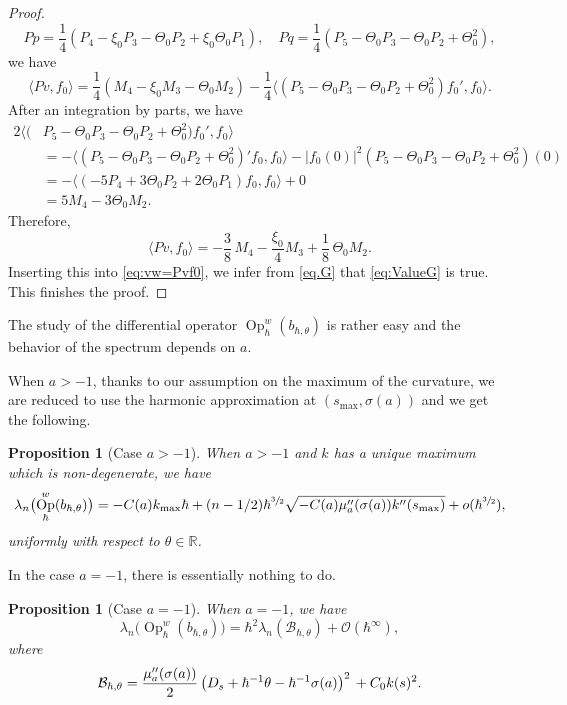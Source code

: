 \documentclass[10pt]{amsart}
\DeclareMathOperator{\Op}{Op}
\theoremstyle{plain}
\newtheorem{proposition}[theorem]{Proposition}
\theoremstyle{definition}
\begin{document}
\begin{proof}
\[
Pp=\frac14(P_4-\xi_0P_3-\Theta_0P_2+\xi_0\Theta_0P_1), \quad Pq=\frac14(P_5-\Theta_0P_3-\Theta_0P_2+\Theta_0^2),
\]
we have\vspace*{-3pt}
\[
\langle Pv,f_0\rangle=\frac14(M_4-\xi_0M_3-\Theta_0M_2)
-\frac14 \langle (P_5-\Theta_0P_3-\Theta_0P_2+\Theta_0^2)f_0',f_0\rangle.
\]
After an integration by parts, we have
\[
\begin{aligned}
2 \langle(&P_5-\Theta_0P_3-\Theta_0P_2+\Theta_0^2)f_0',f_0\rangle\\
&=- \bigl\langle (P_5-\Theta_0P_3-\Theta_0P_2+\Theta_0^2)'f_0,f_0\bigr\rangle -|f_0(0)|^2(P_5-\Theta_0P_3-\Theta_0P_2+\Theta_0^2)(0)\\
&=- \bigl\langle (-5P_4+3\Theta_0P_2+2\Theta_0P_1)f_0,f_0\bigr\rangle+0\\
&=5M_4-3\Theta_0M_2.
\end{aligned}
\]
Therefore,\vspace*{-3pt}
\[
\langle Pv,f_0\rangle=-\frac38\,M_4-\frac{\xi_0}4M_3+\frac18\,\Theta_0M_2.
\]
Inserting this into \eqref{eq:vw=Pvf0}, we infer from \eqref{eq.G} that \eqref{eq:ValueG} is true.
This finishes the proof.
\end{proof}

The study of the differential operator $\Op^w_\hbar (b_{\hbar,\theta})$ is rather easy and the behavior of the spectrum depends on $a$.

When $a>-1$, thanks to our assumption on the maximum of the curvature, we are reduced to use the harmonic approximation at $(s_{\max},\sigma(a))$ and we get the following.

\begin{proposition}[Case $a>-1$]\label{prop:finala>}
When $a>-1$ and $k$ has a unique maximum which is non-degenerate, we have
\[
\lambda_n\bigl(\Op^w_\hbar (b_{\hbar,\theta})\bigr)=-C(a)k_{\max}\hbar+(n-1/2)\hbar^{\sfrac32}\sqrt{-C(a)\mu''_a(\sigma(a))k''(s_{\max}) }+o(\hbar^{\sfrac32}),
\]
uniformly with respect to $\theta\in\mathbb{R}$.
\end{proposition}
In the case $a=-1$, there is essentially nothing to do.

\begin{proposition}[Case $a=-1$]\label{pro:final-1}
When $a=-1$, we have
\[
\lambda_n\bigl(\Op^w_\hbar (b_{\hbar,\theta})\bigr)=\hbar^2\lambda_n\left(\mathcal{B}_{\hbar,\theta}\right)+\mathscr{O}(\hbar^\infty),
\]
where
\begin{equation*}
\mathcal{B}_{\hbar,\theta}=\frac{\mu''_a(\sigma(a))}{2}\left(D_s+\hbar^{-1}\theta-\hbar^{-1}\sigma(a)\right)^2\\
+C_0 k(s)^2.
\end{equation*}
\end{proposition}
\end{document}
